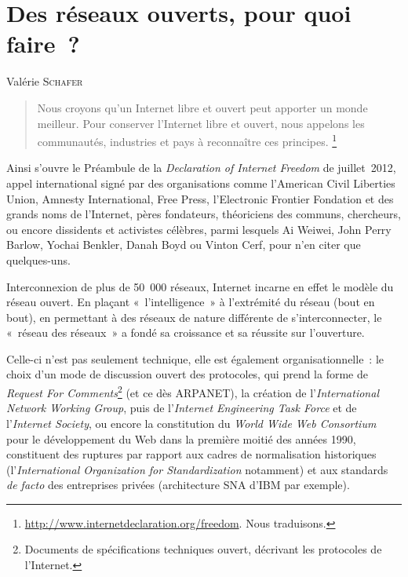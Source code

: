 \documentclass{FramateX}
\begin{document}
\chapter*{Des réseaux ouverts, pour quoi faire~?}
{}

\begin{refsection}

\begin{flushright}
Valérie \textsc{Schafer}
\end{flushright}
\vspace{10 mm}



\begin{quote}
Nous croyons qu'un Internet libre et ouvert peut
apporter un monde meilleur. Pour conserver l'Internet
libre et ouvert, nous appelons les communautés, industries et pays à reconnaître ces principes.
\footnote{\url{http://www.internetdeclaration.org/freedom}. Nous traduisons.}
\end{quote}


Ainsi s'ouvre le Préambule de la \textit{Declaration of
Internet Freedom} de juillet~2012, appel international signé par des
organisations comme l'American Civil Liberties Union,
Amnesty International, Free Press, l'Electronic
Frontier Fondation et des grands noms de l'Internet,
pères fondateurs, théoriciens des communs, chercheurs, ou encore
dissidents et activistes célèbres, parmi lesquels Ai Weiwei, John Perry
Barlow, Yochai Benkler, Danah Boyd ou Vinton Cerf, pour
n'en citer que quelques-uns. 

Interconnexion de plus de 50~000 réseaux, Internet incarne en effet le
modèle du réseau ouvert. En plaçant «~l'intelligence~»
à l'extrémité du réseau (bout en bout), en permettant
à des réseaux de nature différente de
s'interconnecter, le «~réseau des réseaux~» a fondé sa
croissance et sa réussite sur l'ouverture. 

Celle-ci n'est pas seulement technique, elle est
également organisationnelle~: le choix d'un mode de
discussion ouvert des protocoles, qui prend la forme de \textit{Request
For Comments}\footnote{Documents de spécifications techniques ouvert,
décrivant les protocoles de l'Internet.} (et ce dès ARPANET), la création de
l'\textit{International Network Working Group}, puis
de l'\textit{Internet Engineering Task Force} et de
l'\textit{Internet Society}, ou encore la constitution
du \textit{World Wide Web Consortium} pour le développement du Web dans
la première moitié des années 1990, constituent des ruptures par
rapport aux cadres de normalisation historiques
(l'\textit{International Organization for
Standardization} notamment) et aux standards \textit{de facto}
des entreprises privées (architecture SNA d'IBM par
exemple). 


\end{refsection}
\end{document}
